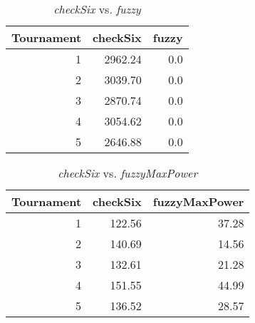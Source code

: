 \begin{table}[H]
\centering
\caption{\emph{checkSix} vs. \emph{fuzzy}}
\label{checkSix vs. fuzzy}
\begin{tabular}{r|r|r}
Tournament	& checkSix	& fuzzy	\\ \hline
1			& 2962.24	& 0.0	\\
2			& 3039.70	& 0.0	\\
3			& 2870.74	& 0.0	\\
4			& 3054.62	& 0.0	\\
5			& 2646.88	& 0.0
\end{tabular}
\end{table}

\begin{table}[H]
\centering
\caption{\emph{checkSix} vs. \emph{fuzzyMaxPower}}
\label{checkSix vs. fuzzyMaxPower}
\begin{tabular}{r|r|r}
Tournament	& checkSix	& fuzzyMaxPower	\\ \hline
1			& 122.56	& 37.28			\\
2			& 140.69	& 14.56			\\
3			& 132.61	& 21.28			\\
4			& 151.55	& 44.99			\\
5			& 136.52	& 28.57
\end{tabular}
\end{table}